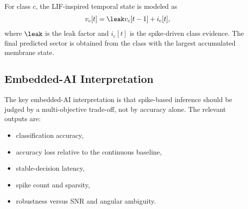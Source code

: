 For class \(c\), the LIF-inspired temporal state is modeled as
\begin{equation}
    v_c[t] = \leak v_c[t-1] + i_c[t],
\end{equation}
where \(\leak\) is the leak factor and \(i_c[t]\) is the spike-driven class evidence. The final predicted sector is obtained from the class with the largest accumulated membrane state.

\subsection{Embedded-AI Interpretation}

The key embedded-AI interpretation is that spike-based inference should be judged by a multi-objective trade-off, not by accuracy alone. The relevant outputs are:

\begin{itemize}
    \item classification accuracy,
    \item accuracy loss relative to the continuous baseline,
    \item stable-decision latency,
    \item spike count and sparsity,
    \item robustness versus SNR and angular ambiguity.
\end{itemize}
